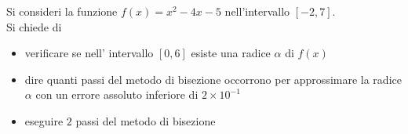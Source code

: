 Si consideri la funzione $f(x)=x^2-4x-5$ nell'intervallo
$[-2,7]$.
\\
\noindent
Si chiede di
\begin{itemize}
\item verificare se nell' intervallo $[0,6]$ esiste una radice $\alpha$ di $f(x)$
\item  dire quanti passi del metodo di bisezione occorrono per
approssimare la radice $\alpha$ con un errore assoluto inferiore di $2\times10^{-1}$
\item eseguire $2$ passi del metodo di bisezione
\end{itemize}
